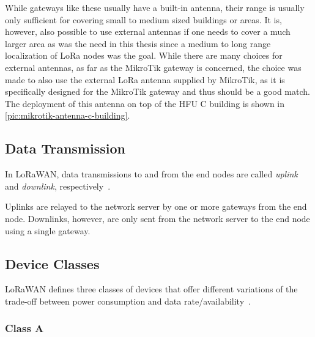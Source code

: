 While gateways like these usually have a built-in antenna, their range is usually only sufficient for covering small to medium sized buildings or areas.
It is, however, also possible to use external antennas if one needs to cover a much larger area as was the need in this thesis since a medium to long range localization of \ac{LoRa} nodes was the goal.
While there are many choices for external antennas, as far as the MikroTik gateway is concerned, the choice was made to also use the external \ac{LoRa} antenna supplied by MikroTik, as it is specifically designed for the MikroTik gateway and thus should be a good match.
The deployment of this antenna on top of the \ac{HFU} C building is shown in \cref{pic:mikrotik-antenna-c-building}.

\subsection{Data Transmission}

In LoRaWAN, data transmissions to and from the end nodes are called \emph{uplink} and \emph{downlink}, respectively~\cite[p. 12]{lora_alliance_inc_lorawan_2017}.

Uplinks are relayed to the network server by one or more gateways from the end node.
Downlinks, however, are only sent from the network server to the end node using a single gateway.
\subsection{Device Classes}

\ac{LoRaWAN} defines three classes of devices that offer different variations of the trade-off between power consumption and data rate/availability~\cite[p. 10]{lora_alliance_inc_lorawan_2017}.

\subsubsection{Class A}

